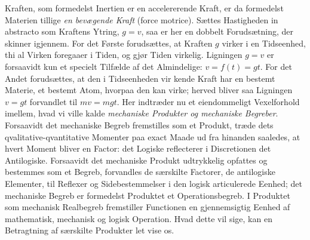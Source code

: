 \documentclass[12pt]{book}
\newcommand{\apage}[1]{\marginnote{\footnotesize\textit{[#1]}}}
\begin{document}
Kraften, som formedelst Inertien er en accelererende Kraft, er da formedelst Materien
tillige \emph{en bevægende Kraft} (force motrice). Sættes Hastigheden in abstracto som
Kraftens Ytring, $g = v$, saa er her en dobbelt Forudsætning, der skinner igjennem. For
det Første forudsættes, at Kraften $g$ virker i en Tidseenhed, thi al Virken foregaaer i
Tiden, og gjør Tiden virkelig. Ligningen $g = v$ er forsaavidt kun et specielt Tilfælde af
det Almindelige: $v = f(t) = gt$. For det Andet forudsættes, at den i Tidseenheden
vir\-%
kende \apage{350} Kraft har en bestemt Materie, et bestemt Atom, hvorpaa den kan virke; herved bliver
saa Ligningen $v = gt$ forvandlet til $mv = mgt$. Her indtræder nu et eiendommeligt
Vexelforhold imellem, hvad vi ville kalde \emph{mechaniske Produkter og mechaniske
Begreber}. Forsaavidt det mechaniske Begreb fremstilles som et Produkt, træde dets
qvalitative-qvantitative Momenter paa exact Maade ud fra hinanden saaledes, at hvert
Moment bliver en Factor: det Logiske reflecterer i Discretionen det Antilogiske.
Forsaavidt det mechaniske Produkt udtrykkelig opfattes og bestemmes som et Begreb,
forvandles de særskilte Factorer, de antilogiske Elementer, til Reflexer og
Sidebestemmelser i den logisk articulerede Eenhed; det mechaniske Begreb er formedelst
Produktet et Operationsbegreb. I Produktet som mechanisk Realbegreb fremstiller Functionen
en gjennemsigtig Eenhed af mathematisk, mechanisk og logisk Operation. Hvad dette vil
sige, kan en Betragtning af særskilte Produkter let vise os.
\end{document}
